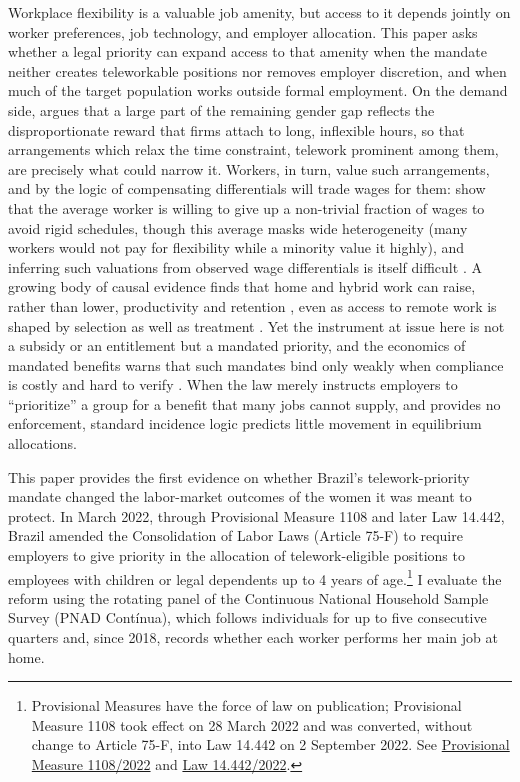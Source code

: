 \documentclass[12pt]{article}
\begin{document}
Workplace flexibility is a valuable job amenity, but access to it depends jointly on worker preferences, job technology, and employer allocation. This paper asks whether a legal priority can expand access to that amenity when the mandate neither creates teleworkable positions nor removes employer discretion, and when much of the target population works outside formal employment. On the demand side, \citet{goldin2014} argues that a large part of the remaining gender gap reflects the disproportionate reward that firms attach to long, inflexible hours, so that arrangements which relax the time constraint, telework prominent among them, are precisely what could narrow it. Workers, in turn, value such arrangements, and by the logic of compensating differentials \citep{rosen1986} will trade wages for them: \citet{maspallais2017} show that the average worker is willing to give up a non-trivial fraction of wages to avoid rigid schedules, though this average masks wide heterogeneity (many workers would not pay for flexibility while a minority value it highly), and inferring such valuations from observed wage differentials is itself difficult \citep{lavetti2023}. A growing body of causal evidence finds that home and hybrid work can raise, rather than lower, productivity and retention \citep{bloom2015,bloomhanliang2024}, even as access to remote work is shaped by selection as well as treatment \citep{emanuelharrington2024}. Yet the instrument at issue here is not a subsidy or an entitlement but a mandated priority, and the economics of mandated benefits warns that such mandates bind only weakly when compliance is costly and hard to verify \citep{summers1989,gruber1994}. When the law merely instructs employers to ``prioritize'' a group for a benefit that many jobs cannot supply, and provides no enforcement, standard incidence logic predicts little movement in equilibrium allocations.

This paper provides the first evidence on whether Brazil's telework-priority mandate changed the labor-market outcomes of the women it was meant to protect. In March 2022, through Provisional Measure 1108 and later Law 14.442, Brazil amended the Consolidation of Labor Laws (Article 75-F) to require employers to give priority in the allocation of telework-eligible positions to employees with children or legal dependents up to 4 years of age.\footnote{Provisional Measures have the force of law on publication; Provisional Measure 1108 took effect on 28 March 2022 and was converted, without change to Article 75-F, into Law 14.442 on 2 September 2022. See \href{https://www.planalto.gov.br/ccivil_03/_ato2019-2022/2022/mpv/mpv1108.htm}{Provisional Measure 1108/2022} and \href{https://www.planalto.gov.br/ccivil_03/_ato2019-2022/2022/lei/l14442.htm}{Law 14.442/2022}.} I evaluate the reform using the rotating panel of the Continuous National Household Sample Survey (PNAD Cont\'inua), which follows individuals for up to five consecutive quarters and, since 2018, records whether each worker performs her main job at home.
\end{document}

